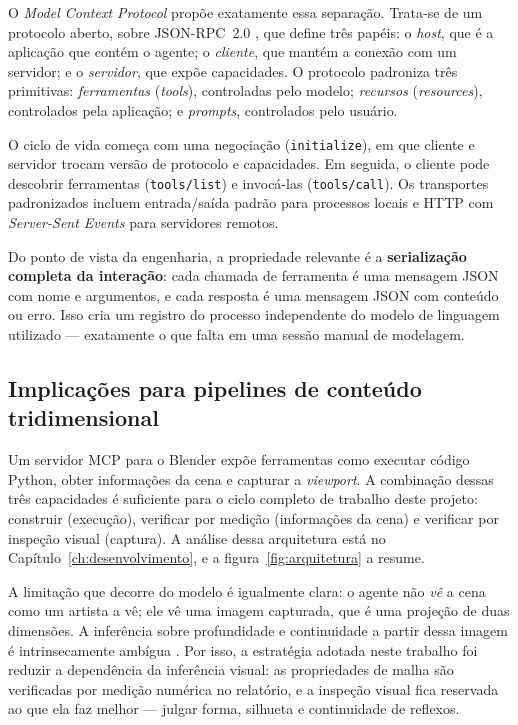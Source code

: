 O \emph{Model Context Protocol} \cite{mcpspec2024} prop\~oe exatamente essa separa\c{c}\~ao.
Trata-se de um protocolo aberto, sobre JSON-RPC~2.0 \cite{jsonrpc2020}, que define tr\^es
pap\'eis: o \emph{host}, que \'e a aplica\c{c}\~ao que cont\'em o agente; o \emph{cliente}, que
mant\'em a conex\~ao com um servidor; e o \emph{servidor}, que exp\~oe capacidades. O protocolo
padroniza tr\^es primitivas: \emph{ferramentas} (\emph{tools}), controladas pelo modelo;
\emph{recursos} (\emph{resources}), controlados pela aplica\c{c}\~ao; e
\emph{prompts}, controlados pelo usu\'ario.

O ciclo de vida come\c{c}a com uma negocia\c{c}\~ao (\texttt{initialize}), em que cliente e
servidor trocam vers\~ao de protocolo e capacidades. Em seguida, o cliente pode descobrir
ferramentas (\texttt{tools/list}) e invoc\'a-las (\texttt{tools/call}). Os transportes
padronizados incluem entrada/sa\'ida padr\~ao para processos locais e HTTP com
\emph{Server-Sent Events} para servidores remotos.

Do ponto de vista da engenharia, a propriedade relevante \'e a \textbf{serializa\c{c}\~ao
completa da intera\c{c}\~ao}: cada chamada de ferramenta \'e uma mensagem JSON com nome e
argumentos, e cada resposta \'e uma mensagem JSON com conte\'udo ou erro. Isso cria um registro
do processo independente do modelo de linguagem utilizado --- exatamente o que falta em uma
sess\~ao manual de modelagem.

\subsection{Implica\c{c}\~oes para pipelines de conte\'udo tridimensional}

Um servidor MCP para o Blender exp\~oe ferramentas como executar c\'odigo Python, obter
informa{\c{c}}\~oes da cena e capturar a \emph{viewport}. A combina\c{c}\~ao dessas tr\^es
capacidades \'e suficiente para o ciclo completo de trabalho deste projeto: construir
(execu\c{c}\~ao), verificar por medi\c{c}\~ao (informa\c{c}\~oes da cena) e verificar por
inspe\c{c}\~ao visual (captura). A an\'alise dessa arquitetura est\'a no
Cap\'itulo~\ref{ch:desenvolvimento}, e a figura~\ref{fig:arquitetura} a resume.

A limita\c{c}\~ao que decorre do modelo \'e igualmente clara: o agente n\~ao \emph{v\^e} a cena
como um artista a v\^e; ele v\^e uma imagem capturada, que \'e uma proje\c{c}\~ao de duas
dimens\~oes. A infer\^encia sobre profundidade e continuidade a partir dessa imagem \'e
intrinsecamente amb\'igua \cite{hartley2004}. Por isso, a estrat\'egia adotada neste trabalho
foi reduzir a depend\^encia da infer\^encia visual: as propriedades de malha s\~ao verificadas por
medi\c{c}\~ao num\'erica no relat\'orio, e a inspe\c{c}\~ao visual fica reservada ao que ela faz
melhor --- julgar forma, silhueta e continuidade de reflexos.

